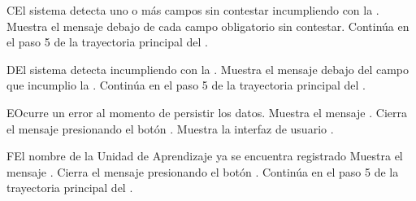 \begin{UCtrayectoriaA}{C}{El sistema detecta uno o más campos sin contestar incumpliendo con la .}
	\UCpaso Muestra el mensaje debajo de cada campo obligatorio sin contestar.
	\UCpaso Continúa en el paso 5 de la trayectoria principal del .
\end{UCtrayectoriaA}

\begin{UCtrayectoriaA}{D}{El sistema detecta incumpliendo con la .}
	\UCpaso Muestra el mensaje  debajo del campo que incumplio la .
	\UCpaso Continúa en el paso 5 de la trayectoria principal del .
\end{UCtrayectoriaA}

\begin{UCtrayectoriaA}{E}{Ocurre un error al momento de persistir los datos.}
	\UCpaso Muestra el mensaje .
	\UCpaso[\UCactor] Cierra el mensaje presionando el botón .
	\UCpaso Muestra la interfaz de usuario .
\end{UCtrayectoriaA}


\begin{UCtrayectoriaA}{F}{El nombre de la Unidad de Aprendizaje ya se encuentra registrado}
	\UCpaso Muestra el mensaje .
	\UCpaso[\UCactor] Cierra el mensaje presionando el botón .
	\UCpaso Continúa en el paso 5 de la trayectoria principal del .
\end{UCtrayectoriaA}